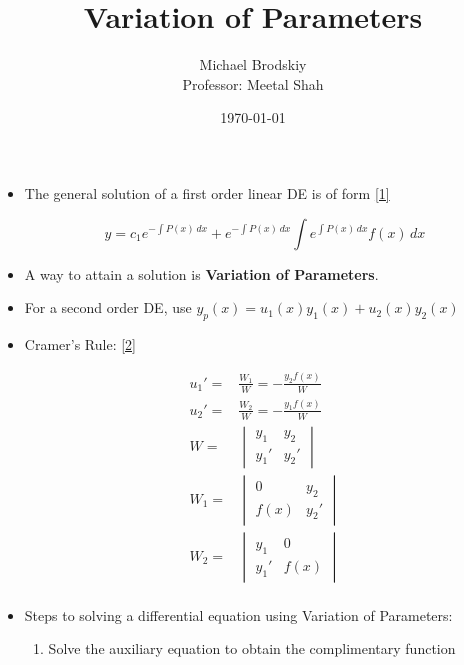 \documentclass[12pt]{article}
\title{Variation of Parameters}
\date{\today}
\author{Michael Brodskiy\\ \small Professor: Meetal Shah}
\begin{document}
\maketitle

\begin{itemize}

  \item The general solution of a first order linear DE is of form \eqref{1}

    \begin{equation}
      y=c_1e^{-\int P(x)\,dx}+e^{-\int P(x)\,dx}\int e^{\int P(x)\,dx}f(x)\,dx
      \label{1}
    \end{equation}

  \item A way to attain a solution is \textbf{Variation of Parameters}.

  \item For a second order DE, use $y_p(x)=u_1(x)y_1(x)+u_2(x)y_2(x)$

  \item Cramer's Rule: \eqref{2}

    \begin{equation}
      \begin{split}
        u_1'=&\frac{W_1}{W}=-\frac{y_2f(x)}{W}\\
        u_2'=&\frac{W_2}{W}=-\frac{y_1f(x)}{W}\\
        W=&\begin{vmatrix} y_1 & y_2 \\ y_1' & y_2' \end{vmatrix}\\
        W_1=&\begin{vmatrix} 0 & y_2 \\ f(x) & y_2' \end{vmatrix}\\
        W_2=&\begin{vmatrix} y_1 & 0 \\ y_1' & f(x) \end{vmatrix}\\
      \end{split}
      \label{2}
    \end{equation}

  \item Steps to solving a differential equation using Variation of Parameters:

    \begin{enumerate}

      \item Solve the auxiliary equation to obtain the complimentary function


\end{enumerate}
\end{itemize}
\end{document}
